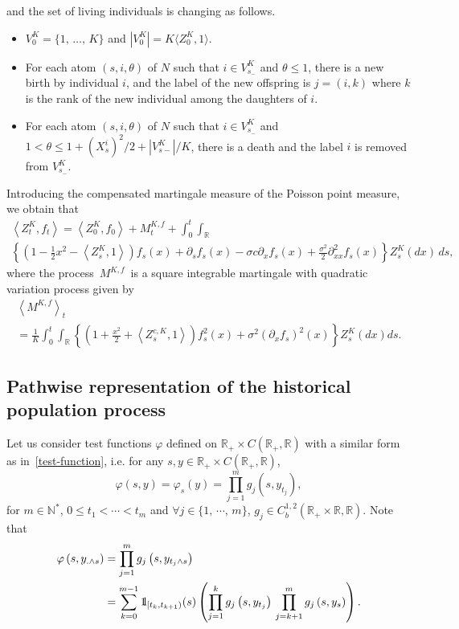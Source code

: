 \documentclass[AHL,Unicode,longabstracts,published]{cedram}
\newcommand*\N{\mathbb{N}}
\newcommand*\R{\mathbb{R}}
\newcommand*\ind{{\mathchoice {\rm 1\mskip-4mu l} {\rm 1\mskip-4mu l} {\rm 1\mskip-4.5mu l} {\rm 1\mskip-5mu l}}}
\let\oldforall\forall
\renewcommand*{\forall}{\mathrel{\oldforall}}
\begin{document}
and the set of living individuals is changing as follows.
\begin{itemize}
\item $V^K_0=\{1,\,\ldots,\,K\}$ and $|V^K_0|=K\langle Z^K_0,1\rangle$.
\item For each atom $(s,i,\theta)$ of $N$ such that $i\in V^K_{s_-}$ and $\theta\leq 1$, there is a new birth by individual $i$, and the label of the new offspring is $j=(i,k)$ where $k$ is the rank of the new individual among the daughters of $i$.
\item For each atom $(s,i,\theta)$ of $N$ such that $i\in V^K_{s_-}$ and $1<\theta\leq 1+(X^i_s)^2/2+|V^K_{s-}|/K$, there is a death and the label $i$ is removed from $V^K_{s_-}$.
\end{itemize}

Introducing the compensated martingale measure of the Poisson point measure, we obtain that
\begin{multline}\label{ZK}
\left\langle Z^{K}_{t},f_t\right\rangle=\left\langle Z^{K}_0,f_0\right\rangle +M^{K, f}_{t} +\int_{0}^{t} \int_{\R}\\
\left\{ \left(1-\frac{1}{2}x^2-\left\langle Z^{K}_{s}, 1\right\rangle\right)f_s(x)
+\partial_sf_s(x)-\sigma c \partial_xf_s(x)+\frac{\sigma^2}{2}\partial^2_{xx}f_s(x)\right\} Z^{K}_{s}(dx)\, ds, 
\end{multline}
where the process $\,M^{K, f}\,$ is a square integrable martingale with quadratic variation process given by
\begin{multline}\label{crochet}
\left\langle M^{K, f} \right\rangle_{t}\\
= \frac{1}{K} \int_{0}^t \int_{\R} \left\{ \left(1+\frac{x^2}{2} + \left\langle Z^{c, K}_{s}, 1\right\rangle\right)f_s^2(x) + {\sigma^2} \left(\partial_x f_s\right)^2(x) \right\} Z^{K}_{s}(dx) ds.
\end{multline}


\subsection{Pathwise representation of the historical population process}\label{app:sde-hist}
Let us consider test functions $\varphi$ defined on $\R_{+}\times C(\R_+,\R)$ with a similar form as in~\eqref{test-function}, i.e. for any $s,y\in \R_{+}\times C(\R_+,\R)$,
\[
\varphi(s,y)=\varphi_s(y) = \prod_{j=1}^m g_{j}\left(s, y_{t_{j}}\right),
\]
for $m\in \N^*$, $0\le t_{1}<\cdots <t_{m}$ and $\forall j \in \{1,\,\cdots,\,m\}$, $g_{j}\in C_{b}^{1,2}(\R_{+}\times\R, \R)$. Note that
\begin{align*}
\varphi\left(s,y_{.\wedge s}\right) &=\prod_{j=1}^m g_{j}\left(s, y_{t_{j}\wedge s}\right) \\
&= \sum_{k=0}^{m-1}\ind_{\left[t_k,t_{k+1}\right)}(s)\left(\prod_{j=1}^k g_j\left(s, y_{t_j}\right) \, \prod_{j=k+1}^m g_j\left(s, y_s\right)\right).
\end{align*}
\end{document}

